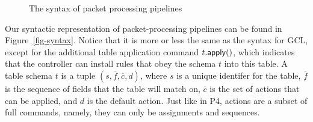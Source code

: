 \begin{figure}
\caption{The syntax of packet processing pipelines}
\label{fig:syntax}
\end{figure}

Our syntactic representation of packet-processing pipelines can be
found in Figure~\ref{fig-syntax}. Notice that it is more or less the
same as the syntax for GCL, except for the additional table
application command $t.\mathsf{apply}()$, which indicates that the controller
can install rules that obey the schema $t$ into this table. A table
schema $t$ is a tuple $(s, \overline f, \overline c, d)$, where $s$ is
a unique identifer for the table, $\overline f$ is the sequence of
fields that the table will match on, $\overline c$ is the set of
actions that can be applied, and $d$ is the default action. Just like
in P4, actions are a subset of full commands, namely, they can only be
assignments and sequences.

